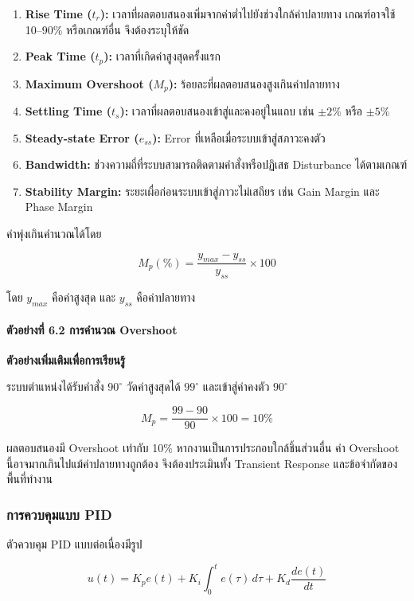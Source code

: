 \begin{enumerate}
    \item \textbf{Rise Time ($t_r$):} เวลาที่ผลตอบสนองเพิ่มจากค่าต่ำไปยังช่วงใกล้ค่าปลายทาง เกณฑ์อาจใช้ 10–90\% หรือเกณฑ์อื่น จึงต้องระบุให้ชัด
    \item \textbf{Peak Time ($t_p$):} เวลาที่เกิดค่าสูงสุดครั้งแรก
    \item \textbf{Maximum Overshoot ($M_p$):} ร้อยละที่ผลตอบสนองสูงเกินค่าปลายทาง
    \item \textbf{Settling Time ($t_s$):} เวลาที่ผลตอบสนองเข้าสู่และคงอยู่ในแถบ เช่น $\pm2\%$ หรือ $\pm5\%$
    \item \textbf{Steady-state Error ($e_{ss}$):} Error ที่เหลือเมื่อระบบเข้าสู่สภาวะคงตัว
    \item \textbf{Bandwidth:} ช่วงความถี่ที่ระบบสามารถติดตามคำสั่งหรือปฏิเสธ Disturbance ได้ตามเกณฑ์
    \item \textbf{Stability Margin:} ระยะเผื่อก่อนระบบเข้าสู่ภาวะไม่เสถียร เช่น Gain Margin และ Phase Margin
\end{enumerate}

ค่าพุ่งเกินคำนวณได้โดย

\[
M_p(\%)=\frac{y_{max}-y_{ss}}{y_{ss}}\times100
\]

โดย $y_{max}$ คือค่าสูงสุด และ $y_{ss}$ คือค่าปลายทาง

\paragraph{ตัวอย่างที่ 6.2 การคำนวณ Overshoot}

\textbf{ตัวอย่างเพิ่มเติมเพื่อการเรียนรู้}

ระบบตำแหน่งได้รับคำสั่ง $90^\circ$ วัดค่าสูงสุดได้ $99^\circ$ และเข้าสู่ค่าคงตัว $90^\circ$

\[
M_p=\frac{99-90}{90}\times100=10\%
\]

ผลตอบสนองมี Overshoot เท่ากับ 10\% หากงานเป็นการประกอบใกล้ชิ้นส่วนอื่น ค่า Overshoot นี้อาจมากเกินไปแม้ค่าปลายทางถูกต้อง จึงต้องประเมินทั้ง Transient Response และข้อจำกัดของพื้นที่ทำงาน



\subsubsection{การควบคุมแบบ PID}

ตัวควบคุม PID แบบต่อเนื่องมีรูป

\[
u(t)=K_p e(t)+K_i\int_0^t e(\tau)\,d\tau+K_d\frac{de(t)}{dt}
\]

